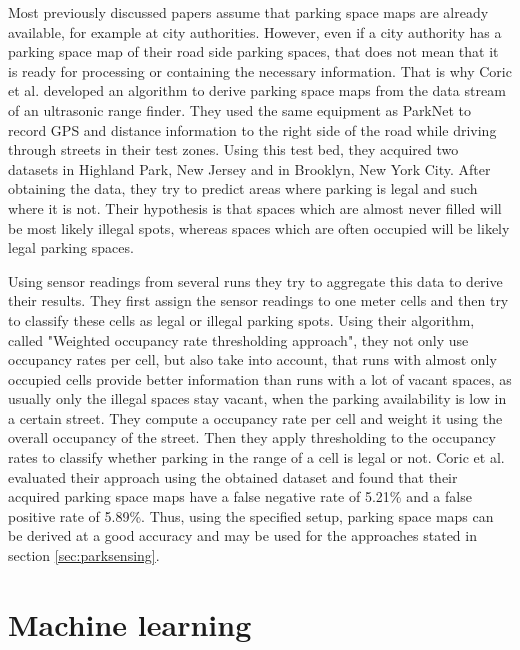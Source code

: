 Most previously discussed papers assume that parking space maps are already available, for example at city authorities. However, even if a city authority has a parking space map of their road side parking spaces, that does not mean that it is ready for processing or containing the necessary information. That is why Coric et al. \cite{Coric2013} developed an algorithm to derive parking space maps from the data stream of an ultrasonic range finder. They used the same equipment as ParkNet \cite{Mathur:2010:PDS:1814433.1814448} to record GPS and distance information to the right side of the road while driving through streets in their test zones. Using this test bed, they acquired two datasets in Highland Park, New Jersey and in Brooklyn, New York City. After obtaining the data, they try to predict areas where parking is legal and such where it is not. Their hypothesis is that spaces which are almost never filled will be most likely illegal spots, whereas spaces which are often occupied will be likely legal parking spaces.

Using sensor readings from several runs they try to aggregate this data to derive their results. They first assign the sensor readings to one meter cells and then try to classify these cells as legal or illegal parking spots. Using their algorithm, called "Weighted occupancy rate thresholding approach", they not only use occupancy rates per cell, but also take into account, that runs with almost only occupied cells provide better information than runs with a lot of vacant spaces, as usually only the illegal spaces stay vacant, when the parking availability is low in a certain street. They compute a occupancy rate per cell and weight it using the overall occupancy of the street. Then they apply thresholding to the occupancy rates to classify whether parking in the range of a cell is legal or not. Coric et al. evaluated their approach using the obtained dataset and found that their acquired parking space maps have a false negative rate of 5.21\% and a false positive rate of 5.89\%. Thus, using the specified setup, parking space maps can be derived at a good accuracy and may be used for the approaches stated in section \ref{sec:parksensing}.






\section{Machine learning}

